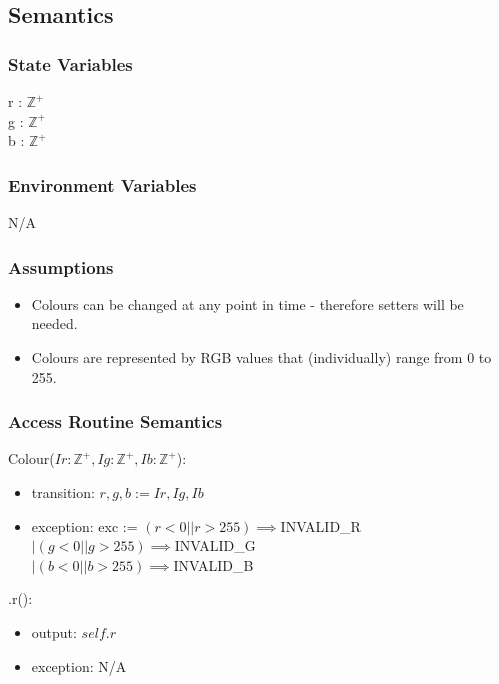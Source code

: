 \documentclass[12pt, titlepage]{article}
\begin{document}
\subsection{Semantics}
\subsubsection{State Variables}
r : $\mathbb{Z}^+$ \\
g : $\mathbb{Z}^+$ \\
b : $\mathbb{Z}^+$ \\

\subsubsection{Environment Variables}
N/A

\subsubsection{Assumptions}
\begin{itemize}
	\item Colours can be changed at any point in time - therefore setters will 
	be needed.
	\item Colours are represented by RGB values that (individually) range from 
	0 to 255.
\end{itemize}

\subsubsection{Access Routine Semantics}
\noindent Colour($Ir: \mathbb{Z}^+, Ig: \mathbb{Z}^+, Ib: \mathbb{Z}^+$):
\begin{itemize}
	\item transition: $r, g, b := Ir, Ig, Ib$
	\item exception: exc := $(r < 0 || r > 255) \implies $INVALID\_R \\
		$ | (g < 0 || g > 255) \implies $INVALID\_G \\ $| (b < 0 || b > 255) 
		\implies $INVALID\_B
\end{itemize}

\noindent .r():
\begin{itemize}
	\item output: $self.r$
	\item exception: N/A
\end{itemize}
\end{document}

